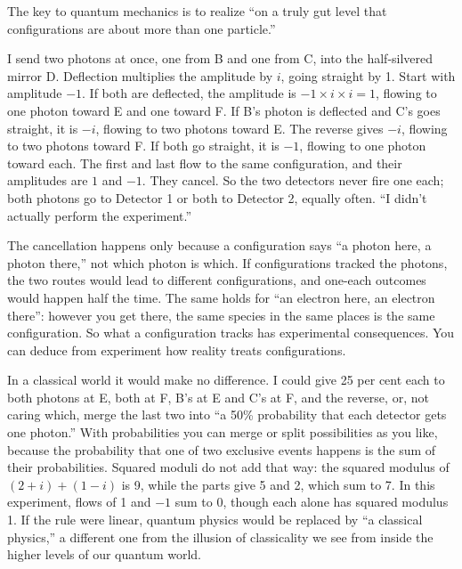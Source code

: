 
The key to quantum mechanics is to realize ``on a truly gut level that configurations are about more than one particle.''

I send two photons at once, one from B and one from C, into the half-silvered mirror D. Deflection multiplies the amplitude by $i$, going straight by 1. Start with amplitude $-1$. If both are deflected, the amplitude is $-1 \times i \times i = 1$, flowing to one photon toward E and one toward F. If B's photon is deflected and C's goes straight, it is $-i$, flowing to two photons toward E. The reverse gives $-i$, flowing to two photons toward F. If both go straight, it is $-1$, flowing to one photon toward each. The first and last flow to the same configuration, and their amplitudes are $1$ and $-1$. They cancel. So the two detectors never fire one each; both photons go to Detector 1 or both to Detector 2, equally often. ``I didn't actually perform the experiment.'' 

The cancellation happens only because a configuration says ``a photon here, a photon there,'' not which photon is which. If configurations tracked the photons, the two routes would lead to different configurations, and one-each outcomes would happen half the time. The same holds for ``an electron here, an electron there'': however you get there, the same species in the same places is the same configuration. So what a configuration tracks has experimental consequences. You can deduce from experiment how reality treats configurations. 

In a classical world it would make no difference. I could give 25 per cent each to both photons at E, both at F, B's at E and C's at F, and the reverse, or, not caring which, merge the last two into ``a 50\% probability that each detector gets one photon.'' With probabilities you can merge or split possibilities as you like, because the probability that one of two exclusive events happens is the sum of their probabilities. Squared moduli do not add that way: the squared modulus of $(2+i)+(1-i)$ is 9, while the parts give 5 and 2, which sum to 7. In this experiment, flows of 1 and $-1$ sum to 0, though each alone has squared modulus 1. If the rule were linear, quantum physics would be replaced by ``a classical physics,'' a different one from the illusion of classicality we see from inside the higher levels of our quantum world. 

